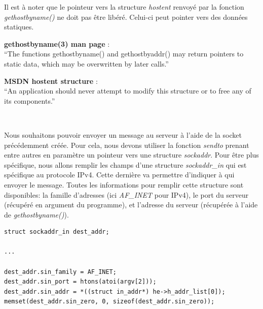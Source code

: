 \begin{mdframed}[backgroundcolor=lightblue2, linecolor=darkblue]
Il est à noter que le pointeur vers la structure \emph{hostent} renvoyé par la fonction \emph{gethostbyname()} ne doit pas être libéré. Celui-ci peut pointer vers des données statiques.

\begin{mdframed}[backgroundcolor=lightblue, linecolor=darkblue]
	\textbf{gethostbyname(3) man page} :\\ %
	``The functions gethostbyname() and gethostbyaddr() may  return  pointers to  static  data, which may be overwritten by later calls.''
\end{mdframed}
\begin{mdframed}[backgroundcolor=lightblue, linecolor=darkblue]
	\noindent\textbf{MSDN hostent structure} :\\ %
	``An application should never attempt to modify this structure or to free any of its components.''
\end{mdframed}
\end{mdframed}
\

Nous souhaitons pouvoir envoyer un message au serveur à l'aide de la socket précédemment créée. Pour cela, nous devons utiliser la fonction \emph{sendto} prenant entre autres en paramètre un pointeur vers une structure \emph{sockaddr}. Pour être plus spécifique, nous allons remplir les champs d'une structure \emph{sockaddr\_in} qui est spécifique au protocole IPv4. Cette dernière va permettre d'indiquer à qui envoyer le message. Toutes les informations pour remplir cette structure sont disponibles: la famille d'adresses (ici \emph{AF\_INET} pour IPv4), le port du serveur (récupéré en argument du programme), et l'adresse du serveur (récupérée à l'aide de \emph{gethostbyname()}).

\begin{lstlisting}
struct sockaddr_in dest_addr;

...

dest_addr.sin_family = AF_INET;
dest_addr.sin_port = htons(atoi(argv[2]));
dest_addr.sin_addr = *((struct in_addr*) he->h_addr_list[0]);
memset(dest_addr.sin_zero, 0, sizeof(dest_addr.sin_zero));
\end{lstlisting}
\

